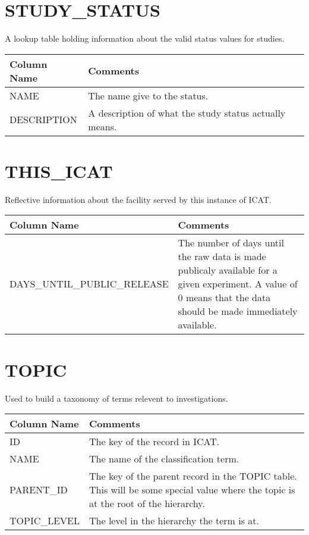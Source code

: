 \documentclass{report}
\begin{document}
\section{STUDY\_STATUS}

A lookup table holding information about the valid status values for studies.\\

\begin{tabular}{|l|l|}
\hline
Column Name & Comments \\ \hline
NAME & \multicolumn{1}{p{100mm}|}{
The name give to the status.} \\ \hline
DESCRIPTION & \multicolumn{1}{p{100mm}|}{
A description of what the study status actually means.} \\ \hline
\end{tabular}
\section{THIS\_ICAT}

Reflective information about the facility served by this instance of ICAT.\\

\begin{tabular}{|l|l|}
\hline
Column Name & Comments \\ \hline
DAYS\_UNTIL\_PUBLIC\_RELEASE & \multicolumn{1}{p{100mm}|}{
The number of days until the raw data is made publicaly available for a given experiment. A value of 0 means that the data should be made immediately available.} \\ \hline
\end{tabular}
\section{TOPIC}

Used to build a taxonomy of terms relevent to investigations.\\

\begin{tabular}{|l|l|}
\hline
Column Name & Comments \\ \hline
ID & \multicolumn{1}{p{100mm}|}{
The key of the record in ICAT.} \\ \hline
NAME & \multicolumn{1}{p{100mm}|}{
The name of the classification term.} \\ \hline
PARENT\_ID & \multicolumn{1}{p{100mm}|}{
The key of the parent record in the TOPIC table. This will be some special value where the topic is at the root of the hierarchy.} \\ \hline
TOPIC\_LEVEL & \multicolumn{1}{p{100mm}|}{
The level in the hierarchy the term is at.} \\ \hline
\end{tabular}
\end{document}

